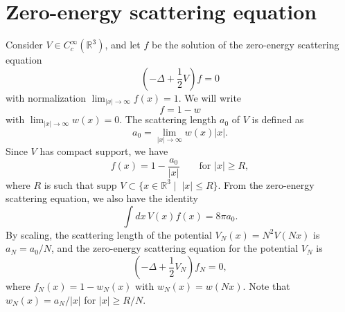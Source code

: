 \documentclass[11pt,a4paper]{scrartcl}
\newcommand{\R}{\mathds{R}}
\begin{document}
\section{Zero-energy scattering equation}


Consider $V \in C_c^\infty(\R^3)$, and let $f$ be the solution of the
zero-energy scattering equation
\[
  \left( -\Delta + \frac{1}{2} V \right) f = 0
\]
with normalization $\lim_{|x|\to\infty} f(x) = 1$. We will write
\[
  f = 1 - w
\]
with $\lim_{|x|\to\infty} w(x) = 0$. The scattering length $a_0$ of $V$ is
defined as
\[
  a_0 = \lim_{|x| \to \infty} w(x)|x|.
\]
Since $V$ has compact support, we have
\[
  f(x) = 1 - \frac{a_0}{|x|} \qquad \text{for } |x| \ge R,
\]
where $R$ is such that $\text{supp }V \subset \{ x \in \R^3 \; | \;\; |x| \le
R \}$. From the zero-energy scattering equation, we also have the identity
\[
  \int dx \, V(x) f(x) = 8 \pi a_0.
\]
By scaling, the scattering length of the potential $V_N(x) = N^2 V(Nx)$ is
$a_N = a_0/N$, and the zero-energy scattering equation for the potential $V_N$
is
\begin{equation}
  \label{eq:scatteringequation}
  \left( -\Delta + \frac{1}{2} V_N \right) f_N = 0,
\end{equation}
where $f_N(x) = 1 - w_N(x)$ with $w_N(x) = w(Nx)$. Note that $w_N(x) =
a_N/|x|$ for $|x| \ge R/N$.
\end{document}
